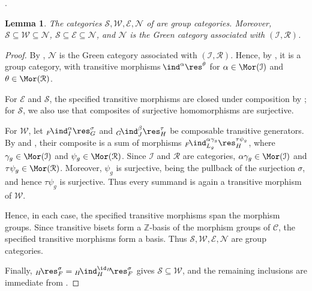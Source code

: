 \documentclass{amsart}
\numberwithin{equation}{section}%
\newtheorem{Lem}[equation]{Lemma}
\theoremstyle{remark}
\theoremstyle{definition}
\newcommand{\lind}[1]{{}_{#1}\!\ind}
\newcommand{\lres}[1]{{}_{#1}\!\res}
\begin{document}
\cite[Sec.~3]{Barker16a}.
%
\begin{Lem}
\label{lem:four-group-categories}
The categories
$\mathcal S,\mathcal W,\mathcal E,\mathcal N$
of 
are group categories. Moreover,
$\mathcal S\subseteq\mathcal W\subseteq\mathcal N$,
$\mathcal S\subseteq\mathcal E\subseteq\mathcal N$,
and $\mathcal N$ is the Green category associated with
$(\mathcal I,\mathcal R)$.
\end{Lem}
%
\begin{proof}
By ,
$\mathcal N$ is the Green category associated with
$(\mathcal I,\mathcal R)$.
Hence, by ,
it is a group category, with transitive morphisms
$\lind{}^\alpha\res^\theta$ for
$\alpha\in\Mor(\mathcal I)$ and
$\theta\in\Mor(\mathcal R)$.

For $\mathcal E$ and $\mathcal S$, the specified transitive morphisms
are closed under composition by
; for $\mathcal S$, we also use that
composites of surjective homomorphisms are surjective.

For $\mathcal W$, let
$\lind{F}_I^\alpha\res_G^\sigma$ and
$\lind{G}_J^\beta\res_H^\tau$
be composable transitive generators.
By  and , their composite
is a sum of morphisms
$\lind{F}_{L_g}^{\alpha\gamma_g}\res_H^{\tau\psi_g}$,
where $\gamma_g\in\Mor(\mathcal I)$ and
$\psi_g\in\Mor(\mathcal R)$.
Since $\mathcal I$ and $\mathcal R$ are categories,
$\alpha\gamma_g\in\Mor(\mathcal I)$ and
$\tau\psi_g\in\Mor(\mathcal R)$. Moreover, $\psi_g$ is surjective,
being the pullback of the surjection $\sigma$, and hence
$\tau\psi_g$ is surjective.
Thus every summand is again a transitive morphism of $\mathcal W$.

Hence, in each case, the specified transitive morphisms span the
morphism groups. Since transitive bisets form a $\mathbb Z$-basis of
the morphism groups of $\mathcal C$, the specified transitive
morphisms form a basis. Thus
$\mathcal S,\mathcal W,\mathcal E,\mathcal N$ are group categories.

Finally,
$\lres{H}_F^\sigma
=
\lind{H}_H^{\id_H}\!\lres{}_F^\sigma$
gives $\mathcal S\subseteq\mathcal W$, and the remaining inclusions
are immediate from .
\end{proof}
%
\end{document}
